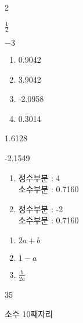 \documentclass{oblivoir}
\begin{document}
\begin{multicols*}{2}
\columnbreak

%
\begin{enumerate*}[itemjoin=\qquad\qquad]
\item
2
\item
\(\frac12\)
\item
\(-3\)
\end{enumerate*}

%
\begin{enumerate}
\item
0.9042
\item
3.9042
\item
-2.0958
\item
0.3014
\end{enumerate}

%
\begin{enumerate*}[itemjoin=\tabto{.5\columnwidth}]
\item
1.6128
\item
-2.1549
\end{enumerate*}

%
\begin{enumerate}
\item
정수부분 : 4\\
소수부분 : 0.7160
\item
정수부분 : -2\\
소수부분 : 0.7160
\end{enumerate}

%
\begin{enumerate}
\item
\(2a+b\)
\item
\(1-a\)
\item
\(\frac b{2a}\)
\end{enumerate}

\columnbreak

%
\begin{enumerate*}[itemjoin=\qquad\qquad]
\item
35
\item
소수 10째자리
\end{enumerate*}
\end{multicols*}


%
\end{document}

